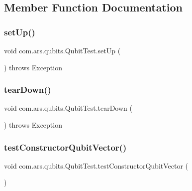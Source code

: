 \subsection{Member Function Documentation}
\hypertarget{classcom_1_1ars_1_1qubits_1_1_qubit_test_ae68c939221768214df5fb417ef7cf766}{}\label{classcom_1_1ars_1_1qubits_1_1_qubit_test_ae68c939221768214df5fb417ef7cf766} 
\subsubsection{\texorpdfstring{set\+Up()}{setUp()}}
{\footnotesize\ttfamily void com.\+ars.\+qubits.\+Qubit\+Test.\+set\+Up (\begin{DoxyParamCaption}{ }\end{DoxyParamCaption}) throws Exception}

\hypertarget{classcom_1_1ars_1_1qubits_1_1_qubit_test_ade4c555dfc00afb0bf8f8580af8647c9}{}\label{classcom_1_1ars_1_1qubits_1_1_qubit_test_ade4c555dfc00afb0bf8f8580af8647c9} 
\subsubsection{\texorpdfstring{tear\+Down()}{tearDown()}}
{\footnotesize\ttfamily void com.\+ars.\+qubits.\+Qubit\+Test.\+tear\+Down (\begin{DoxyParamCaption}{ }\end{DoxyParamCaption}) throws Exception}

\hypertarget{classcom_1_1ars_1_1qubits_1_1_qubit_test_a47f5f10c10403984398612a0ea940099}{}\label{classcom_1_1ars_1_1qubits_1_1_qubit_test_a47f5f10c10403984398612a0ea940099} 
\subsubsection{\texorpdfstring{test\+Constructor\+Qubit\+Vector()}{testConstructorQubitVector()}}
{\footnotesize\ttfamily void com.\+ars.\+qubits.\+Qubit\+Test.\+test\+Constructor\+Qubit\+Vector (\begin{DoxyParamCaption}{ }\end{DoxyParamCaption})}

